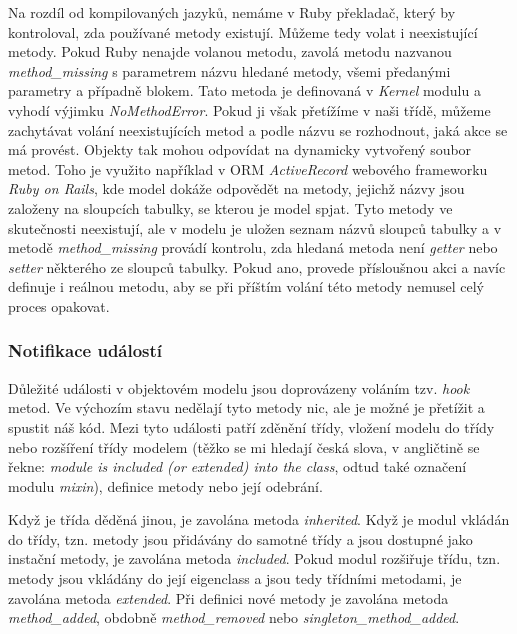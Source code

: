 \documentclass[12pt,a4paper,oneside]{article}
\begin{document}
Na rozdíl od kompilovaných jazyků, nemáme v Ruby překladač, který by kontroloval, zda používané metody existují. Můžeme tedy volat i neexistující metody. Pokud Ruby nenajde volanou metodu, zavolá metodu nazvanou \emph{method\_missing} s parametrem názvu hledané metody, všemi předanými parametry a případně blokem. Tato metoda je definovaná v \emph{Kernel} modulu a vyhodí výjimku \emph{NoMethodError}. Pokud ji však přetížíme v naši třídě, můžeme zachytávat volání neexistujících metod a podle názvu se rozhodnout, jaká akce se má provést. Objekty tak mohou odpovídat na dynamicky vytvořený soubor metod. Toho je využito například v ORM \emph{ActiveRecord} webového frameworku \emph{Ruby on Rails}, kde model dokáže odpovědět na metody, jejichž názvy jsou založeny na sloupcích tabulky, se kterou je model spjat. Tyto metody ve skutečnosti neexistují, ale v modelu je uložen seznam názvů sloupců tabulky a v metodě \emph{method\_missing} provádí kontrolu, zda hledaná metoda není \emph{getter} nebo \emph{setter} některého ze sloupců tabulky. Pokud ano, provede přísloušnou akci a navíc definuje i reálnou metodu, aby se při příštím volání této metody nemusel celý proces opakovat.

\subsubsection{Notifikace událostí}

Důležité události v objektovém modelu jsou doprovázeny voláním tzv. \emph{hook} metod. Ve výchozím stavu nedělají tyto metody nic, ale je možné je přetížit a spustit náš kód. Mezi tyto události patří zděnění třídy, vložení modelu do třídy nebo rozšíření třídy modelem (těžko se mi hledají česká slova, v angličtině se řekne: \emph{module is included (or extended) into the class}, odtud také označení modulu \emph{mixin}), definice metody nebo její odebrání.

Když je třída děděná jinou, je zavolána metoda \emph{inherited}. Když je modul vkládán do třídy, tzn. metody jsou přidávány do samotné třídy a jsou dostupné jako instační metody, je zavolána metoda \emph{included}. Pokud modul rozšiřuje třídu, tzn. metody jsou vkládány do její eigenclass a jsou tedy třídními metodami, je zavolána metoda \emph{extended}. Při definici nové metody je zavolána metoda \emph{method\_added}, obdobně \emph{method\_removed} nebo \emph{singleton\_method\_added}.



\end{document}
